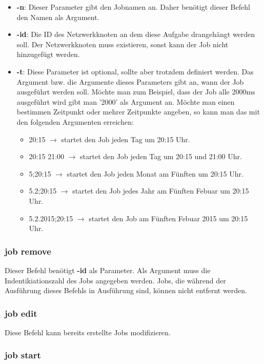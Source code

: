 \documentclass[11pt,a4paper]{report}
\begin{document}
\begin{itemize}
\item \textbf{-n}: Dieser Parameter gibt den Jobnamen an. Daher benötigt dieser Befehl den Namen als Argument.
\item \textbf{-id}: Die ID des Netzwerkknoten an dem diese Aufgabe drangehängt werden soll. Der Netzwerkknoten muss existieren, sonst kann der Job nicht hinzugefügt werden.
\item \textbf{-t}: Diese Parameter ist optional, sollte aber trotzdem definiert werden. Das Argument bzw. die Argumente dieses Parameters gibt an, wann der Job ausgeführt werden soll. Möchte man zum Beispiel, dass der Job alle 2000ms ausgeführt wird gibt man '2000' als Argument an. Möchte man einen bestimmen Zeitpunkt oder mehrer Zeitpunkte angeben, so kann man das mit den folgenden Argumenten erreichen:
  \begin{itemize}
  \item 20:15 $\rightarrow$ startet den Job jeden Tag um 20:15 Uhr.
  \item 20:15 21:00 $\rightarrow$ startet den Job jeden Tag um 20:15 und 21:00 Uhr.
  \item 5;20:15 $\rightarrow$ startet den Job jeden Monat am Fünften um 20:15 Uhr.
  \item 5.2;20:15 $\rightarrow$ startet den Job jedes Jahr am Fünften Febuar um 20:15 Uhr.
  \item 5.2.2015;20:15 $\rightarrow$ startet den Job am Fünften Febuar 2015 um 20:15 Uhr.
  \end{itemize}
\end{itemize}

\subsubsection{job remove}

Dieser Befehl benötigt \textbf{-id} als Parameter. Als Argument muss die Indentikiationszahl des Jobs angegeben werden. Jobs, die während der Ausführung dieses Befehls in Ausführung sind, können nicht entfernt werden.

\subsubsection{job edit}

Diese Befehl kann bereits erstellte Jobs modifizieren. 

\subsubsection{job start}
\end{document}
